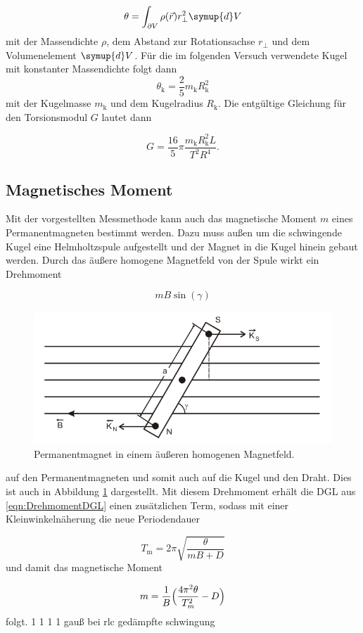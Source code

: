 \begin{equation}
  \theta = \int_{\partial V}^{} \rho(\vec{r}) r_\perp^2 \symup{d}V
\end{equation}
mit der Massendichte $\rho$, dem Abstand zur Rotationsachse $r_\perp$ und dem
Volumenelement $\symup{d}V$.
Für die im folgenden Versuch verwendete Kugel mit konstanter Massendichte
folgt dann
\begin{equation}
  \theta_\text{k} = \frac{2}{5} m_\text{k} R_\text{k}^2
\end{equation}
mit der Kugelmasse $m_\text{k}$ und dem Kugelradius $R_\text{k}$.
Die entgültige Gleichung für den Torsionsmodul $G$ lautet dann

\begin{equation}
  G = \frac{16}{5} \pi \frac{m_\text{k}R_\text{k}^2 L}{T^2 R^4}.
\end{equation}


\subsection{Magnetisches Moment}

Mit der vorgestellten Messmethode kann auch das magnetische Moment
$m$ eines Permanentmagneten bestimmt werden.
Dazu muss außen um die schwingende Kugel
eine Helmholtzspule aufgestellt und der Magnet in die Kugel hinein gebaut
werden.
Durch das äußere homogene Magnetfeld von der Spule wirkt ein Drehmoment

\begin{equation}
  mB\sin(\gamma)
\end{equation}

\begin{figure}
  \centering
  \includegraphics[height=5cm]{magnMom.png}
  \caption{Permanentmagnet in einem äußeren homogenen Magnetfeld.}
  \label{fig:MagnetMoment}
\end{figure}

auf den Permanentmagneten und somit auch auf die Kugel und den Draht.
Dies ist auch in Abbildung \ref{fig:MagnetMoment} dargestellt.
Mit diesem Drehmoment erhält die DGL aus \eqref{eqn:DrehmomentDGL} einen
zusätzlichen Term, sodass mit einer Kleinwinkelnäherung
die neue Periodendauer

\begin{equation}
  T_\text{m} = 2\pi \sqrt{\frac{\theta}{mB+D}}
\end{equation}
und damit das magnetische Moment

\begin{equation}
  m = \frac{1}{B}\Bigl(\frac{4 \pi^2 \theta}{T_m^2}-D\Bigr)
\end{equation}
folgt.
1
1
1
1
gauß bei rlc gedämpfte schwingung
\cite{sample}
